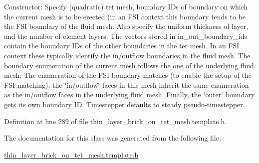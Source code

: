 Constructor\+: Specify (quadratic) tet mesh, boundary I\+Ds of boundary on which the current mesh is to be erected (in an F\+SI context this boundary tends to be the F\+SI boundary of the fluid mesh. Also specify the uniform thickness of layer, and the number of element layers. The vectors stored in in\+\_\+out\+\_\+boundary\+\_\+ids contain the boundary I\+Ds of the other boundaries in the tet mesh. In an F\+SI context these typically identify the in/outflow boundaries in the fluid mesh. The boundary enumeration of the current mesh follows the one of the underlying fluid mesh\+: The enumeration of the F\+SI boundary matches (to enable the setup of the F\+SI matching); the \char`\"{}in/outflow\char`\"{} faces in this mesh inherit the same enumeration as the in/outflow faces in the underlying fluid mesh. Finally, the \char`\"{}outer\char`\"{} boundary gets its own boundary ID. Timestepper defaults to steady pseudo-\/timestepper. 



Definition at line 289 of file thin\+\_\+layer\+\_\+brick\+\_\+on\+\_\+tet\+\_\+mesh.\+template.\+h.



The documentation for this class was generated from the following file\+:\begin{DoxyCompactItemize}
\item 
\hyperlink{thin__layer__brick__on__tet__mesh_8template_8h}{thin\+\_\+layer\+\_\+brick\+\_\+on\+\_\+tet\+\_\+mesh.\+template.\+h}\end{DoxyCompactItemize}

